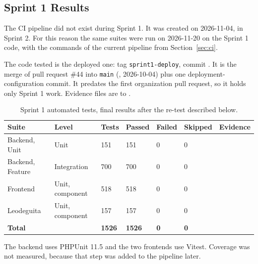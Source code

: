 \subsection{Sprint 1 Results}
\label{sec:results-sprint1}

The CI pipeline did not exist during Sprint 1.
It was created on 2026-11-04, in Sprint 2.
For this reason the same suites were run on 2026-11-20 on the Sprint 1 code, with the commands of the current pipeline from Section~\ref{sec:ci}.

The code tested is the deployed one: tag \texttt{sprint1-deploy}, commit .
It is the merge of pull request \#44 into \texttt{main} (, 2026-10-04) plus one deployment-configuration commit.
It predates the first organization pull request, so it holds only Sprint 1 work.
Evidence files are  to .

\begin{table}[H]
  \centering
  \begin{tabularx}{\linewidth}{L{3cm}L{2.6cm}L{1.4cm}L{1.4cm}L{1.3cm}L{1.4cm}Y}
    \toprule
    Suite & Level & Tests & Passed & Failed & Skipped & Evidence \\
    \midrule
    Backend, Unit & Unit & 151 & 151 & 0 & 0 &  \\
    Backend, Feature & Integration & 700 & 700 & 0 & 0 &  \\
    Frontend & Unit, component & 518 & 518 & 0 & 0 &  \\
    Leodeguita & Unit, component & 157 & 157 & 0 & 0 &  \\
    \midrule
    \textbf{Total} & & \textbf{1526} & \textbf{1526} & \textbf{0} & \textbf{0} & \\
    \bottomrule
  \end{tabularx}
  \caption{Sprint 1 automated tests, final results after the re-test described below.}
  \label{tab:results-sprint1-automated}
\end{table}

The backend uses PHPUnit 11.5 and the two frontends use Vitest.
Coverage was not measured, because that step was added to the pipeline later.


